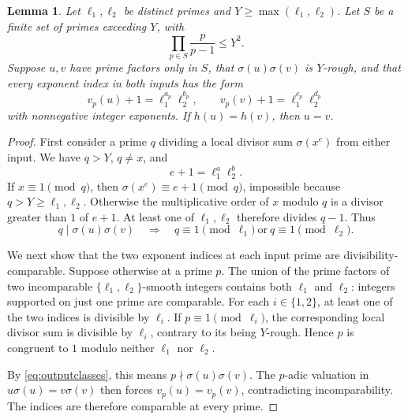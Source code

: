 \documentclass[11pt]{article}
\newtheorem{lemma}[theorem]{Lemma}
\begin{document}
\begin{lemma}\label{lem:twoindex}
Let $\ell_1,\ell_2$ be distinct primes and $Y\ge\max(\ell_1,\ell_2)$. Let $S$ be a finite set of primes exceeding $Y$, with
\[
 \prod_{p\in S}\frac{p}{p-1}\le Y^2.
\]
Suppose $u,v$ have prime factors only in $S$, that $\sigma(u)\sigma(v)$ is $Y$-rough, and that every exponent index in both inputs has the form
\[
 v_p(u)+1=\ell_1^{a_p}\ell_2^{b_p},\qquad
 v_p(v)+1=\ell_1^{c_p}\ell_2^{d_p}
\]
with nonnegative integer exponents. If $h(u)=h(v)$, then $u=v$.
\end{lemma}

\begin{proof}
First consider a prime $q$ dividing a local divisor sum $\sigma(x^e)$ from either input. We have $q>Y$, $q\ne x$, and
\[
 e+1=\ell_1^a\ell_2^b.
\]
If $x\equiv1\pmod q$, then $\sigma(x^e)\equiv e+1\pmod q$, impossible because $q>Y\ge\ell_1,\ell_2$. Otherwise the multiplicative order of $x$ modulo $q$ is a divisor greater than $1$ of $e+1$. At least one of $\ell_1,\ell_2$ therefore divides $q-1$. Thus
\begin{equation}\label{eq:outputclasses}
 q\mid\sigma(u)\sigma(v)
 \quad\Longrightarrow\quad
 q\equiv1\pmod{\ell_1}\ \text{or}\ q\equiv1\pmod{\ell_2}.
\end{equation}

We next show that the two exponent indices at each input prime are divisibility-comparable. Suppose otherwise at a prime $p$. The union of the prime factors of two incomparable $\{\ell_1,\ell_2\}$-smooth integers contains both $\ell_1$ and $\ell_2$: integers supported on just one prime are comparable. For each $i\in\{1,2\}$, at least one of the two indices is divisible by $\ell_i$. If $p\equiv1\pmod{\ell_i}$, the corresponding local divisor sum is divisible by $\ell_i$, contrary to its being $Y$-rough. Hence $p$ is congruent to $1$ modulo neither $\ell_1$ nor $\ell_2$.

By \eqref{eq:outputclasses}, this means $p\nmid\sigma(u)\sigma(v)$. The $p$-adic valuation in $u\sigma(u)=v\sigma(v)$ then forces $v_p(u)=v_p(v)$, contradicting incomparability. The indices are therefore comparable at every prime.


\end{proof}
\end{document}

